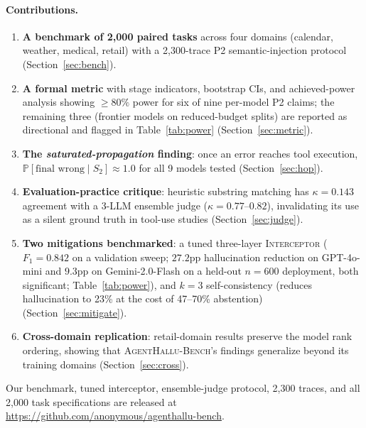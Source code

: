 \documentclass[11pt]{article}
\newcommand{\eps}{\mathrm{EPS}}
\newcommand{\Pr}{\mathbb{P}}
\newcommand{\interceptor}{\textsc{Interceptor}}
\newcommand{\halluben}{\textsc{AgentHallu-Bench}}
\begin{document}
\paragraph{Contributions.}
\begin{enumerate}
  \item \textbf{A benchmark of 2{,}000 paired tasks} across four domains (calendar, weather, medical, retail) with a 2{,}300-trace P2 semantic-injection protocol (Section~\ref{sec:bench}).
  \item \textbf{A formal \eps{} metric} with stage indicators, bootstrap CIs, and achieved-power analysis showing $\geq\!80\%$ power for six of nine per-model P2 claims; the remaining three (frontier models on reduced-budget splits) are reported as directional and flagged in Table~\ref{tab:power} (Section~\ref{sec:metric}).
  \item \textbf{The \emph{saturated-propagation} finding}: once an error reaches tool execution, $\Pr[\text{final wrong} \mid S_2] \approx 1.0$ for all 9 models tested (Section~\ref{sec:hop}).
  \item \textbf{Evaluation-practice critique}: heuristic substring matching has $\kappa\!=\!0.143$ agreement with a 3-LLM ensemble judge ($\kappa\!=\!0.77\text{--}0.82$), invalidating its use as a silent ground truth in tool-use studies (Section~\ref{sec:judge}).
  \item \textbf{Two mitigations benchmarked}: a tuned three-layer \interceptor{} ($F_1\!=\!0.842$ on a validation sweep; $27.2$pp hallucination reduction on GPT-4o-mini and $9.3$pp on Gemini-2.0-Flash on a held-out $n\!=\!600$ deployment, both significant; Table~\ref{tab:power}), and $k\!=\!3$ self-consistency (reduces hallucination to 23\% at the cost of 47--70\% abstention) (Section~\ref{sec:mitigate}).
  \item \textbf{Cross-domain replication}: retail-domain results preserve the model rank ordering, showing that \halluben{}'s findings generalize beyond its training domains (Section~\ref{sec:cross}).
\end{enumerate}

Our benchmark, tuned interceptor, ensemble-judge protocol, 2{,}300 traces, and all 2{,}000 task specifications are released at \url{https://github.com/anonymous/agenthallu-bench}.
\end{document}
